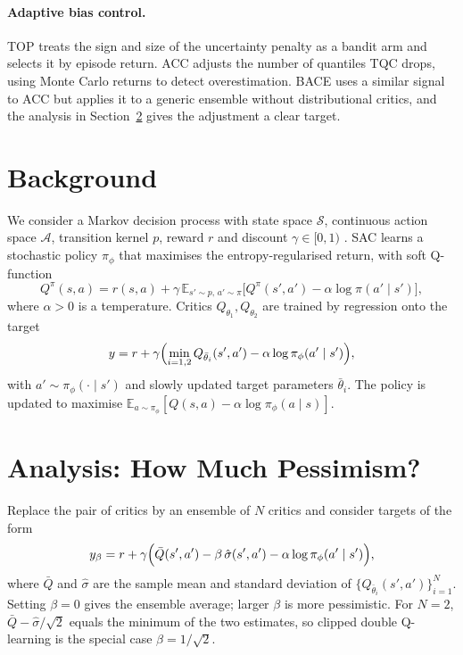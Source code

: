\documentclass[10pt,twocolumn,letterpaper]{article}
\newcommand{\E}{\mathbb{E}}
\newcommand{\Qbar}{\bar{Q}}
\newcommand{\method}{\textsc{BACE}}
\begin{document}
\paragraph{Adaptive bias control.} TOP \citep{moskovitz2021} treats the sign and size of the uncertainty penalty as a bandit arm and selects it by episode return. ACC \citep{dorka2023} adjusts the number of quantiles TQC drops, using Monte Carlo returns to detect overestimation. \method{} uses a similar signal to ACC but applies it to a generic ensemble without distributional critics, and the analysis in Section~\ref{sec:analysis} gives the adjustment a clear target.

\section{Background}
\label{sec:background}

We consider a Markov decision process with state space $\mathcal{S}$, continuous action space $\mathcal{A}$, transition kernel $p$, reward $r$ and discount $\gamma\in[0,1)$ \citep{sutton2018}. SAC \citep{haarnoja2018} learns a stochastic policy $\pi_\phi$ that maximises the entropy-regularised return, with soft Q-function
\begin{equation}
  Q^\pi(s,a) = r(s,a) + \gamma\,\E_{s'\sim p,\,a'\sim\pi}\bigl[Q^\pi(s',a') - \alpha\log\pi(a'\mid s')\bigr],
\end{equation}
where $\alpha>0$ is a temperature. Critics $Q_{\theta_1}, Q_{\theta_2}$ are trained by regression onto the target
\begin{equation}\label{eq:sac-target}
  y = r + \gamma\Bigl(\min_{i=1,2} Q_{\bar\theta_i}(s',a') - \alpha\log\pi_\phi(a'\mid s')\Bigr),
\end{equation}
with $a'\sim\pi_\phi(\cdot\mid s')$ and slowly updated target parameters $\bar\theta_i$. The policy is updated to maximise $\E_{a\sim\pi_\phi}[Q(s,a) - \alpha\log\pi_\phi(a\mid s)]$.

\section{Analysis: How Much Pessimism?}
\label{sec:analysis}

Replace the pair of critics by an ensemble of $N$ critics and consider targets of the form
\begin{equation}\label{eq:ensemble-target}
  y_\beta = r + \gamma\Bigl(\Qbar(s',a') - \beta\,\hat\sigma(s',a') - \alpha\log\pi_\phi(a'\mid s')\Bigr),
\end{equation}
where $\Qbar$ and $\hat\sigma$ are the sample mean and standard deviation of $\{Q_{\bar\theta_i}(s',a')\}_{i=1}^N$. Setting $\beta=0$ gives the ensemble average; larger $\beta$ is more pessimistic. For $N=2$, $\Qbar - \hat\sigma/\sqrt{2}$ equals the minimum of the two estimates, so clipped double Q-learning is the special case $\beta = 1/\sqrt{2}$.
\end{document}
